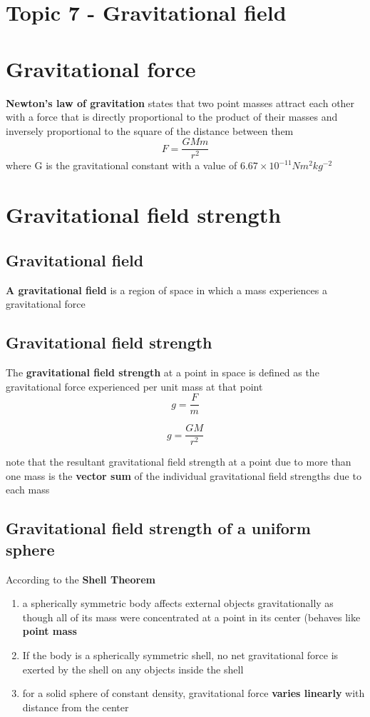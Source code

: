 \documentclass[a4paper, 10pt]{article}
\begin{document}
\section*{Topic 7 - Gravitational field} 
\section{Gravitational force}
\begin{framed}
   \textbf{Newton's law of gravitation} states that two point masses attract each other with a force that is directly proportional to the product of their masses and inversely proportional to the square of the distance between them
\[
F = \frac{GMm}{r^2}
\]
where G is the gravitational constant with a value of $6.67 \times 10^{-11} Nm^2 kg^{-2}$ 
\end{framed}	

\section{Gravitational field strength}
\subsection{Gravitational field}
\begin{framed}
   \textbf{A gravitational field} is a region of space in which a mass experiences a gravitational force
\end{framed}	

\subsection{Gravitational field strength}
\begin{framed}
   The \textbf{gravitational field strength} at a point in space is defined as the gravitational force experienced per unit mass at that point
   \[
   g = \frac{F}{m}
   \]

   \[
   g = \frac{GM}{r^2}
   \]

   note that the resultant gravitational field strength at a point due to more than one mass is the \textbf{vector sum} of the individual gravitational field strengths due to each mass
\end{framed}	

\subsection{Gravitational field strength of a uniform sphere}
According to the \textbf{Shell Theorem}
\begin{enumerate}
   \item a spherically symmetric body affects external objects gravitationally as though all of its mass were concentrated at a point in its center (behaves like \textbf{point mass} 
   \item If the body is a spherically symmetric shell, no net gravitational force is exerted by the shell on any objects inside the shell 
   \item for a solid sphere of constant density, gravitational force \textbf{varies linearly} with distance from the center
\end{enumerate}	
\end{document}
